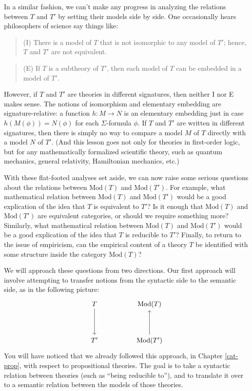 In a similar fashion, we can't make any progress in analyzing the
relations between $T$ and $T'$ by setting their models side by side.
One occasionally hears philosophers of science say things like:
\begin{quote}
  (I) There is a model of $T$ that is not isomorphic to any model of
  $T'$; hence, $T$ and $T'$ are not
  equivalent.  \end{quote} \begin{quote} (E) If $T$ is a subtheory of
  $T'$, then each model of $T$ can be embedded in a model of $T'$.
\end{quote}
However, if $T$ and $T'$ are theories in different signatures, then
neither I nor E makes sense.  The notions of isomorphism and
elementary embedding are signature-relative: a function $h:M\to N$ is
an elementary embedding just in case $h(M(\phi ))=N(\phi )$ for each
$\Sigma$-formula $\phi$.  If $T$ and $T'$ are written in different
signatures, then there is simply no way to compare a model $M$ of $T$
directly with a model $N$ of $T'$.  (And this lesson goes not only for
theories in first-order logic, but for any mathematically formalized
scientific theory, such as quantum mechanics, general relativity,
Hamiltonian mechanics, etc.)

With these flat-footed analyses set aside, we can now raise some
serious questions about the relations between $\mathrm{Mod}(T)$ and
$\mathrm{Mod}(T')$.  For example, what mathematical relation between
$\mathrm{Mod}(T)$ and $\mathrm{Mod}(T')$ would be a good explication
of the idea that $T$ is equivalent to $T'$?  Is it enough that
$\mathrm{Mod}(T)$ and $\mathrm{Mod}(T')$ are equivalent categories, or
should we require something more?  Similarly, what mathematical
relation between $\mathrm{Mod}(T)$ and $\mathrm{Mod}(T')$ would be a
good explication of the idea that $T$ is reducible to $T'$?  Finally,
to return to the issue of empiricism, can the empirical content of a
theory $T$ be identified with some structure inside the category
$\mathrm{Mod}(T)$?

We will approach these questions from two directions.  Our first
approach will involve attempting to transfer notions from the
syntactic side to the semantic side, as in the following picture:
\[ \begin{tikzcd}
    T \arrow{dd} &  & \mathrm{Mod}(T) \\ \\
    T' & & \mathrm{Mod}(T') \arrow{uu} \end{tikzcd} \] You will have
noticed that we already followed this approach, in Chapter
\ref{cat-prop}, with respect to propositional theories.  The goal is
to take a syntactic relation between theories (such as ``being
reducible to''), and to translate it over to a semantic relation
between the models of those theories.

